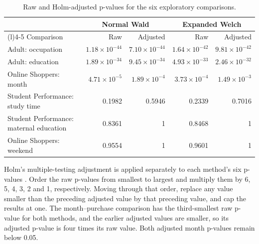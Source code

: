 \begin{table}[H]
\centering
\small
\caption{Raw and Holm-adjusted p-values for the six exploratory comparisons.}
\label{tab:application-holm}
\setlength{\tabcolsep}{4pt}
\begin{tabularx}{\textwidth}{@{}>{\raggedright\arraybackslash}Xrrrr@{}}
\toprule
& \multicolumn{2}{c}{Normal Wald} & \multicolumn{2}{c}{Expanded Welch}\\
\cmidrule(lr){2-3}\cmidrule(l){4-5}
Comparison & Raw & Adjusted & Raw & Adjusted\\
\midrule
Adult: occupation & \(1.18\times10^{-44}\) & \(7.10\times10^{-44}\) & \(1.64\times10^{-42}\) & \(9.81\times10^{-42}\)\\
Adult: education & \(1.89\times10^{-34}\) & \(9.45\times10^{-34}\) & \(4.93\times10^{-33}\) & \(2.46\times10^{-32}\)\\
Online Shoppers: month & \(4.71\times10^{-5}\) & \(1.89\times10^{-4}\) & \(3.73\times10^{-4}\) & \(1.49\times10^{-3}\)\\
Student Performance: study time & 0.1982 & 0.5946 & 0.2339 & 0.7016\\
Student Performance: maternal education & 0.8361 & 1 & 0.8468 & 1\\
Online Shoppers: weekend & 0.9554 & 1 & 0.9601 & 1\\
\bottomrule
\end{tabularx}
\end{table}

Holm's multiple-testing adjustment is applied separately to each method's
six p-values \citep{holm1979}. Order the raw p-values from smallest to largest and
multiply them by 6, 5, 4, 3, 2 and 1, respectively. Moving through that
order, replace any value smaller than the preceding adjusted value by
that preceding value, and cap the results at one. The month--purchase comparison has the
third-smallest raw p-value for both methods, and the earlier adjusted
values are smaller, so its adjusted p-value is four times its raw value.
Both adjusted month p-values remain below 0.05.
